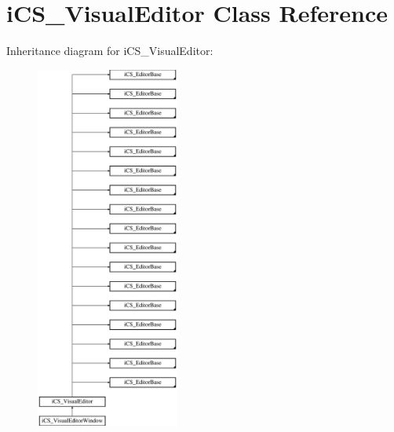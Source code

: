 \hypertarget{classi_c_s___visual_editor}{\section{i\+C\+S\+\_\+\+Visual\+Editor Class Reference}
\label{classi_c_s___visual_editor}
}
Inheritance diagram for i\+C\+S\+\_\+\+Visual\+Editor\+:\begin{figure}[H]
\begin{center}
\leavevmode
\includegraphics[height=12.000000cm]{classi_c_s___visual_editor}
\end{center}
\end{figure}
